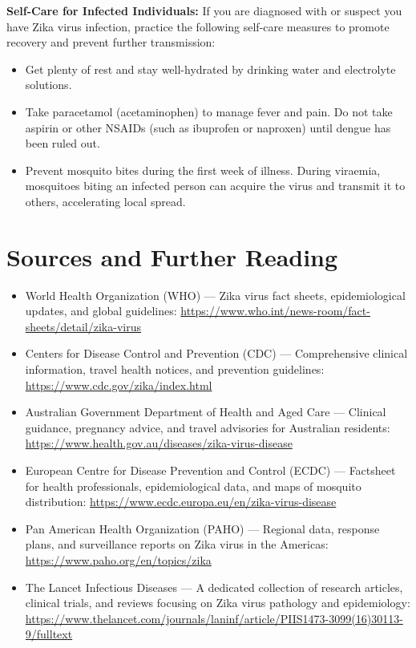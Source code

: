 \textbf{Self-Care for Infected Individuals:}
If you are diagnosed with or suspect you have Zika virus infection, practice the following self-care measures to promote recovery and prevent further transmission:
\begin{itemize}
    \item Get plenty of rest and stay well-hydrated by drinking water and electrolyte solutions.
    \item Take paracetamol (acetaminophen) to manage fever and pain. Do not take aspirin or other NSAIDs (such as ibuprofen or naproxen) until dengue has been ruled out.
    \item Prevent mosquito bites during the first week of illness. During viraemia, mosquitoes biting an infected person can acquire the virus and transmit it to others, accelerating local spread.
\end{itemize}

\section*{Sources and Further Reading}
\begin{itemize}
    \item World Health Organization (WHO) --- Zika virus fact sheets, epidemiological updates, and global guidelines: \url{https://www.who.int/news-room/fact-sheets/detail/zika-virus}
    \item Centers for Disease Control and Prevention (CDC) --- Comprehensive clinical information, travel health notices, and prevention guidelines: \url{https://www.cdc.gov/zika/index.html}
    \item Australian Government Department of Health and Aged Care --- Clinical guidance, pregnancy advice, and travel advisories for Australian residents: \url{https://www.health.gov.au/diseases/zika-virus-disease}
    \item European Centre for Disease Prevention and Control (ECDC) --- Factsheet for health professionals, epidemiological data, and maps of mosquito distribution: \url{https://www.ecdc.europa.eu/en/zika-virus-disease}
    \item Pan American Health Organization (PAHO) --- Regional data, response plans, and surveillance reports on Zika virus in the Americas: \url{https://www.paho.org/en/topics/zika}
    \item The Lancet Infectious Diseases --- A dedicated collection of research articles, clinical trials, and reviews focusing on Zika virus pathology and epidemiology: \url{https://www.thelancet.com/journals/laninf/article/PIIS1473-3099(16)30113-9/fulltext}
\end{itemize}